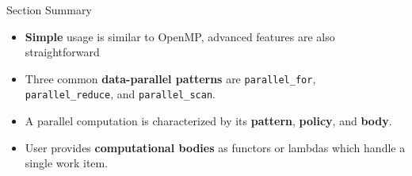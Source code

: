 
\begin{frame}{Section Summary}

  \begin{itemize}
    \item{\textbf{Simple} usage is similar to OpenMP, advanced features are also straightforward}
    \item{Three common \textbf{data-parallel patterns} are \texttt{parallel\_for}, \texttt{parallel\_reduce}, and \texttt{parallel\_scan}.}
    \item{A parallel computation is characterized by its \textbf{pattern}, \textbf{policy}, and \textbf{body}.}
    \item{User provides \textbf{computational bodies} as functors or lambdas which handle a single work item.}
  \end{itemize}

\end{frame}
